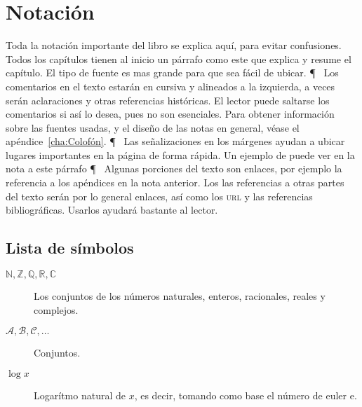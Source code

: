 \chapter{Notación}%
\label{cha:Notación}

	Toda la notación importante del libro se explica aquí, para evitar confusiones.
	Todos los capítulos tienen al inicio un párrafo como este que explica y resume el capítulo.
	El tipo de fuente es mas grande para que sea fácil de ubicar.
\P~
	Los comentarios en el texto estarán en cursiva y alineados a la izquierda, a veces serán aclaraciones y otras referencias históricas. El lector puede saltarse los comentarios si así lo desea, pues no son esenciales.
Para obtener información sobre las fuentes usadas, y el diseño de las notas en general, véase el apéndice~\ref{cha:Colofón}.
\P~
Las señalizaciones en los márgenes ayudan a ubicar lugares importantes en la página de forma rápida. Un ejemplo de puede ver en la nota a este párrafo
\P~
Algunas porciones del texto son enlaces, por ejemplo la referencia a los apéndices en la nota anterior. Los las referencias
a otras partes del texto serán por lo general enlaces, así como los \textsc{url} y las referencias bibliográficas. Usarlos
ayudará bastante al lector.

\section*{Lista de símbolos}%
\label{sec:Lista de símbolos}

\begin{description}
	\item[$\mathbb{N},\mathbb{Z},\mathbb{Q},\mathbb{R},\mathbb{C}$] Los conjuntos de los números naturales,
		enteros, racionales, reales y complejos.
	\item[$\mathcal{A},\mathcal{B},\mathcal{C},\dots$] Conjuntos.
	\item[$\log x$] Logarítmo natural de $x$, es decir, tomando como base el número de euler $\mathrm{e}$.
\end{description}
